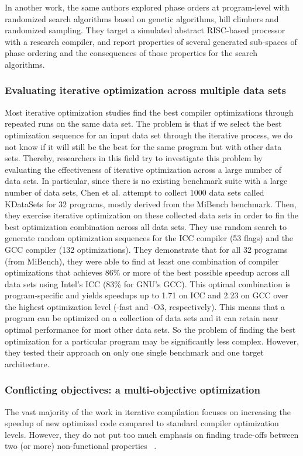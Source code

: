 In another work\cite{cooper2006exploring}, the same authors explored phase orders at program-level with randomized search algorithms based on genetic algorithms, hill climbers and randomized sampling. They target a simulated abstract RISC-based processor with a research compiler, and report properties of several generated sub-spaces of phase ordering and the consequences of those properties for the search algorithms.

\subsubsection{Evaluating iterative optimization across multiple data sets}
Most iterative optimization studies find the best compiler optimizations through repeated runs on the same data set. The problem is that if we select the best optimization sequence for an input data set through the iterative process, we do not know if it will still be the best for the same program but with other data sets. Thereby, researchers in this field try to investigate this problem by evaluating the effectiveness of iterative optimization across a large number of data sets. In particular, since there is no existing benchmark suite with a large number of data sets, Chen et al.\cite{chen2010evaluating} attempt to collect 1000 data sets called KDataSets for 32 programs, mostly derived from the MiBench benchmark. Then, they exercise iterative optimization on these collected data sets in order to fin the best optimization combination across all data sets. 
They use random search to generate random optimization sequences for the ICC compiler (53 flags) and the GCC compiler (132 optimizations).
They demonstrate that for all 32 programs (from MiBench), they were able to find at least one combination of compiler optimizations that achieves 86\% or more of the best possible speedup across all data sets using Intel’s ICC (83\% for GNU’s GCC). This optimal combination is program-specific and yields speedups up to 1.71 on ICC and 2.23 on GCC over the highest optimization level (-fast and -O3, respectively). This means that a program can be optimized on a collection of data sets and it can retain near optimal performance for most other data sets. So the problem of finding the best optimization for a particular program may be significantly less complex. However, they tested their approach on only one single benchmark and one target architecture.




\subsubsection{Conflicting objectives: a multi-objective optimization}
The vast majority of the work in iterative compilation focuses on increasing the speedup of new optimized code compared to standard compiler optimization levels. However, they do not put too much emphasis on finding trade-offs between two (or more) non-functional properties ~\cite{almagor2004finding,hoste2008cole,pan2006fast,pallister2015identifying,chen2012deconstructing,martins2014exploration,lin2008automatic,martinez2014multi}.

